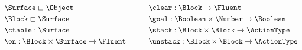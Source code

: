 \vspace{-0.03in}
  \begin{equation*}
    \begin{aligned}\
      &\Surface \sqsubset \Object \\
      &\Block \sqsubset \Surface \\
      &\ctable: \Surface \\
      &\on: \Block \times \Surface \rightarrow \Fluent
             \end{aligned} \hspace{30pt}
 \begin{aligned}
      &\clear: \Block \rightarrow \Fluent \\
      &\goal: \Boolean \times \Number \rightarrow \Boolean \\
      &\stack: \Block \times \Block \rightarrow \ActionType \\
      &\unstack: \Block \times \Block \rightarrow \ActionType
    \end{aligned}
  \end{equation*}

